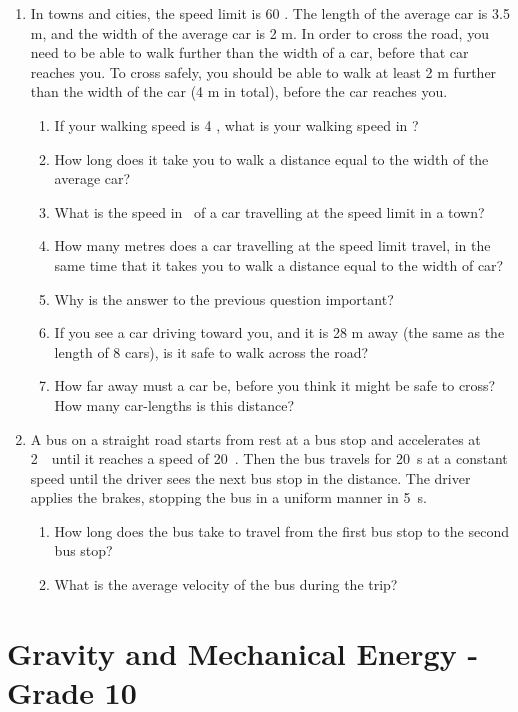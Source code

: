 \begin{enumerate}
\item In towns and cities, the speed limit is 60 \kph. The length of the average car is 3.5 m, and the width of the average car is 2 m. In order to cross the road, you need to be able to walk further than the width of a car, before that car reaches you. To cross safely, you should be able to walk at least 2 m further than the width of the car (4 m in total), before the car reaches you.
\begin{enumerate}
\item If your walking speed is 4 \kph, what is your walking speed in \ms?
\item How long does it take you to walk a distance equal to the width of the average car?
\item What is the speed in \ms\ of a car travelling at the speed limit in a town?
\item How many metres does a car travelling at the speed limit travel, in the same time that it takes you to walk a distance equal to the width of car?
\item Why is the answer to the previous question important?
\item If you see a car driving toward you, and it is 28 m away (the same as the length of 8 cars), is it safe to walk across the road?
\item How far away must a car be, before you think it might be safe to cross? How many car-lengths is this distance?
\end{enumerate}

\item{A bus on a straight road starts from rest at a bus stop and accelerates at 2~\mss\ until it reaches a speed of 20~\ms. Then the bus travels for 20~s at a constant speed until the driver sees the next bus stop in the distance. The driver applies the brakes, stopping the bus in a uniform manner in 5~s.
\begin{enumerate}
\item How long does the bus take to travel from the first bus stop to the second bus stop?
\item What is the average velocity of the bus during the trip?
\end{enumerate}}
\end{enumerate}





\chapter{Gravity and Mechanical Energy - Grade 10}
\label{p:gme10}




